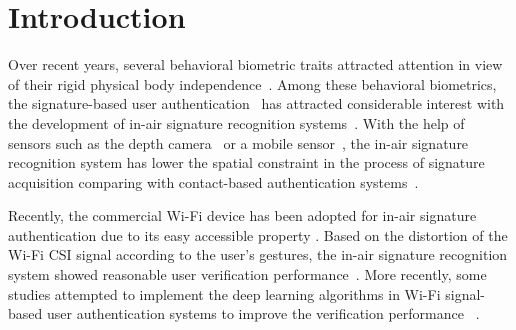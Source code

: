 \documentclass[sigconf]{acmart}
\begin{document}



\maketitle

\section{Introduction}
Over recent years, several behavioral biometric traits attracted attention in view of their rigid physical body independence~\cite{bailador2011analysis}. Among these behavioral biometrics, the signature-based user authentication~\cite{fahmy2010online,sanmorino2012survey,galbally2015line} has attracted considerable interest with the development of in-air signature recognition systems~\cite{jeon2012system,malik20183dairsig,ketabdar2012magnetic}.
With the help of sensors such as the depth camera~\cite{jeon2012system,malik20183dairsig} or a mobile sensor~\cite{ketabdar2012magnetic}, the in-air signature recognition system has lower the spatial constraint in the process of signature acquisition comparing with contact-based authentication systems~\cite{jeon2012system,malik20183dairsig,ketabdar2012magnetic,sesa2012information}.

Recently, the commercial Wi-Fi device has been adopted for in-air signature authentication due to its easy accessible property \cite{moon2017air}. Based on the distortion of the  Wi-Fi CSI signal according to the user's gestures, the in-air signature recognition system showed reasonable user verification performance~\cite{moon2017air}. More recently, some studies attempted to implement the deep learning algorithms in Wi-Fi signal-based user authentication systems to improve the verification performance ~\cite{shi2017smart,pokkunuru2018neuralwave}. 
\end{document}
